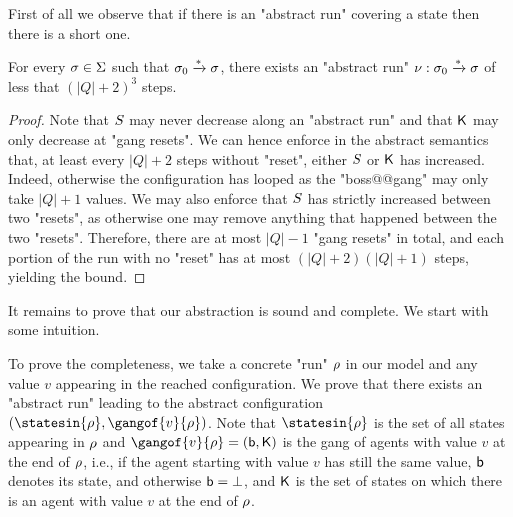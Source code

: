 First of all we observe that if there is an "abstract run" covering a state then there is a short one.

\begin{lemma}
	\label{lem:short-run}
	For every $\sigma \in \Sigma$ such that $\sigma_0 \xrightarrow{*} \sigma$, there exists an "abstract run" $\nu: \sigma_0 \xrightarrow{*} \sigma$ of less that $(|Q|+2)^3$ steps.
\end{lemma}

\ifproofs
\begin{proof}
	Note that $S$ may never decrease along an "abstract run" and that $\mathsf{K}$ may only decrease at "gang resets".
	We can hence enforce in the abstract semantics that, at least every $|Q|+2$ steps without "reset", either $S$ or $\mathsf{K}$ has increased. Indeed, otherwise the configuration has looped as the "boss@@gang" may only take $|Q| +1$ values. We may also enforce that $S$ has strictly increased between two "resets", as otherwise one may remove anything that happened between the two "resets". Therefore, there are at most $|Q|-1$ "gang resets" in total, and each portion of the run with no "reset" has at most $(|Q|+2)(|Q|+1)$ steps, yielding the bound. 
\end{proof}
\fi

It remains to prove that our abstraction is sound and complete. We start with some intuition.

To prove the completeness, we take a concrete "run" $\rho$ in our model and any value $v$ appearing in the reached configuration. We prove that there exists an "abstract run" leading to the abstract configuration $(\statesin{\run}, \gangof{v}{\run})$. Note that $\statesin{\run}$ is the set of all states appearing in $\rho$ and $\gangof{v}{\run} = (\boss, \clique)$ is the gang of agents with value $v$ at the end of $\rho$, i.e., if the agent starting with value $v$ has still the same value, $\mathsf{b}$ denotes its state, and otherwise $\mathsf{b} = \bot$, and $\mathsf{K}$ is the set of states on which there is an agent with value $v$ at the end of $\rho$.

